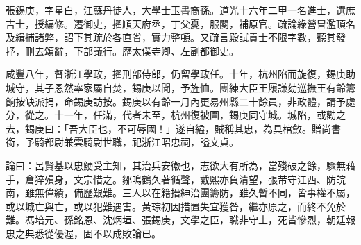 \begin{pinyinscope}
張錫庚，字星白，江蘇丹徒人，大學士玉書裔孫。道光十六年二甲一名進士，選庶吉士，授編修。遷御史，擢順天府丞，丁父憂，服闋，補原官。疏論綠營冒濫頂名及緝捕諸弊，詔下其疏於各直省，實力整頓。又疏言殿試貢士不限字數，聽其發抒，刪去頌辭，下部議行。歷太僕寺卿、左副都御史。

咸豐八年，督浙江學政，擢刑部侍郎，仍留學政任。十年，杭州陷而旋復，錫庚助城守，其子恩然率家屬自焚，錫庚以聞，予旌恤。團練大臣王履謙劾巡撫王有齡籌餉按缺派捐，命錫庚訪按。錫庚以有齡一月內更易州縣二十餘員，非政體，請予處分，從之。十一年，任滿，代者未至，杭州復被圍，錫庚同守城。城陷，或勸之去，錫庚曰：「吾大臣也，不可辱國！」遂自縊，賊稱其忠，為具棺斂。贈尚書銜，予騎都尉兼雲騎尉世職，祀浙江昭忠祠，謚文貞。

論曰：呂賢基以忠鯁受主知，其治兵安徽也，志欲大有所為，當殘破之餘，驟無藉手，倉猝殞身，文宗惜之。鄒鳴鶴久著循聲，戴熙亦負清望，張芾守江西、防皖南，雖無偉績，備歷艱難。三人以在籍搢紳治團籌防，雖久暫不同，皆事權不屬，或以城亡與亡，或以犯難遇害。黃琮初因措置失宜獲咎，繼亦原之，而終不免於難。馮培元、孫銘恩、沈炳垣、張錫庚，文學之臣，職非守土，死皆慘烈，朝廷報忠之典悉從優渥，固不以成敗論已。


\end{pinyinscope}